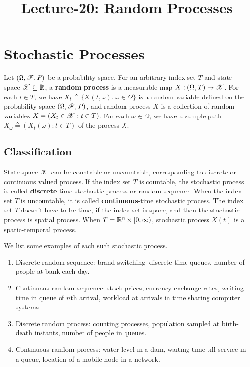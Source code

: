 \documentclass[letterpaper,10pt,english]{article}
\title{Lecture-20: Random Processes}
\author{}
\begin{document}
\maketitle

\section{Stochastic Processes} 

Let $(\Omega, \mathscr{F}, P)$ be a probability space. 
For an arbitrary index set $T$ and state space $\mathscr{X} \subseteq \mathbb{R}$, a \textbf{random process} is a measurable map $X : (\Omega, T) \to \mathscr{X}$. 
For each $t \in T$, we have $X_t \triangleq \{X(t, \omega): \omega \in \Omega\}$ is a random variable defined on the probability space $(\Omega, \mathscr{F}, P)$, 
and random process $X$ is a collection of random variables $X = (X_t \in \mathscr{X}: t \in T)$. 
For each $\omega \in \Omega$, we have a sample path $X_{\omega} \triangleq (X_t(\omega): t \in T)$ of the process $X$. 


\subsection{Classification}
State space $\mathscr{X}$ can be countable or uncountable, corresponding to discrete or continuous valued process.  
If the index set $T$ is countable, the stochastic process is called \textbf{discrete}-time stochastic process or random sequence. 
When the index set $T$ is uncountable, it is called \textbf{continuous}-time stochastic process. 
The index set $T$ doesn't have to be time, if the index set is space, and then the stochastic process is spatial process. 
When $T = \mathbb{R}^n \times [0, \infty)$, stochastic process $X(t)$ is a spatio-temporal process. 
\begin{shaded*}
\begin{exmp}
We list some examples of each such stochastic process. 
\begin{enumerate}[i\_]
\item Discrete random sequence: brand switching, discrete time queues, number of people at bank each day.
\item Continuous random sequence: stock prices, currency exchange rates, waiting time in queue of $n$th arrival, workload at arrivals in time sharing computer systems.
\item Discrete random process:  counting processes, population sampled at birth-death instants, number of people in queues.
\item Continuous random process: water level in a dam, waiting time till service in a queue, location of a mobile node in a network.
\end{enumerate}
\end{exmp}
\end{shaded*}
\end{document}
